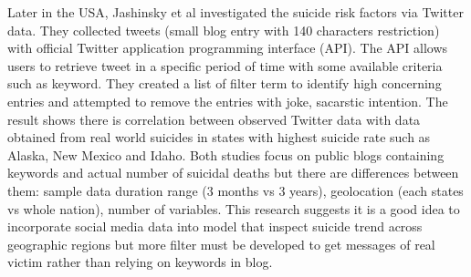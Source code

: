 Later in the USA, Jashinsky et al \cite{Jashinsky2014}  investigated the suicide risk factors via Twitter data. They collected tweets (small blog entry with 140 characters restriction) with official Twitter application programming interface (API). The API allows users to retrieve tweet in a specific period of time with some available criteria such as keyword. They created a list of filter term to identify high concerning entries and attempted to remove the entries with joke, sacarstic intention. The result shows there is correlation between observed Twitter data with data obtained from real world suicides in states with highest suicide rate such as Alaska, New Mexico and Idaho. Both studies focus on public blogs containing keywords and actual number of suicidal deaths but there are differences between them: sample data duration range (3 months vs 3 years), geolocation (each states vs whole nation), number of variables. This research suggests it is a good idea to incorporate social media data into model that inspect suicide trend across geographic regions but more filter must be developed to get messages of real victim rather than relying on keywords in blog.\\

